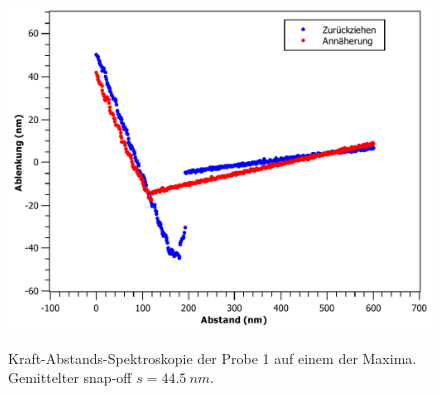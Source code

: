\documentclass[
	a4paper,
	12pt,
	pagesize,
	ngerman
]{scrartcl}
\begin{document}
\begin{figure}[H]
{			\label{fig_dvd_ds5}}{\includegraphics[width=.49\linewidth]{images/DVD/DS5}}
			\caption{Kraft-Abstands-Spektroskopie der Probe 1 auf einem der Maxima. Gemittelter snap-off $s=\SI{44.5}{nm}$.} %
			\label{fig_dvd_ds}
\end{figure}
\begin{figure}[H]
			\centering

\end{figure}
\end{document}
